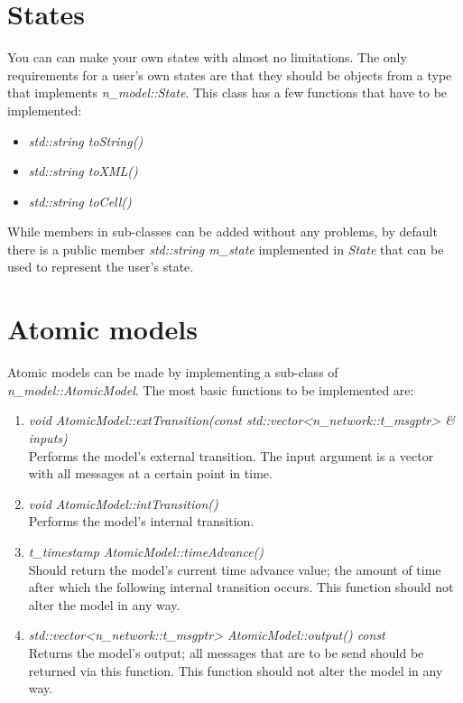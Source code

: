 \section{States}
You can can make your own states with almost no limitations. The only requirements for a user's own states are that they should be objects from a type that implements \textsl{n\_model::State}. This class has a few functions that have to be implemented:
\begin{itemize}
	\item \textsl{std::string toString()}
	\item \textsl{std::string toXML()}
	\item \textsl{std::string toCell()}
\end{itemize}
While members in sub-classes can be added without any problems, by default there is a public member \textsl{std::string m\_state} implemented in \textsl{State} that can be used to represent the user's state.

\section{Atomic models}
Atomic models can be made by implementing a sub-class of \\ \textsl{n\_model::AtomicModel}. The most basic functions to be implemented are:
\begin{enumerate}
	\item \textsl{void AtomicModel::extTransition(const std::vector{\textless}n\_network::t\_msgptr{\textgreater} \& inputs)}\\
		Performs the model's external transition. The input argument is a vector with all messages at a certain point in time.
	\item \textsl{void AtomicModel::intTransition()}\\
		Performs the model's internal transition. 
	\item \textsl{t\_timestamp AtomicModel::timeAdvance()}\\
		Should return the model's current time advance value; the amount of time after which the following internal transition occurs. This function should not alter the model in any way.
	\item \textsl{std::vector{\textless}n\_network::t\_msgptr{\textgreater} AtomicModel::output()  const}\\
		Returns the model's output; all messages that are to be send should be returned via this function. This function should not alter the model in any way.
\end{enumerate}

